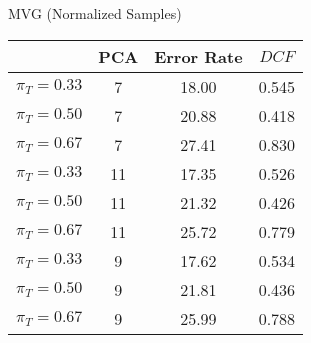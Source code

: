 \caption{MVG (Normalized Samples)}\label{tab:mvgn_acctable}
\begin{center}
\begin{tabular}{|c|c||c|c|}
\hline
\ & PCA & Error Rate & $DCF$\\
\hline
$\pi_T = 0.33$ & 7 & 18.00 & 0.545 \\
$\pi_T = 0.50$ & 7 & 20.88 & 0.418 \\
$\pi_T = 0.67$ & 7 & 27.41 & 0.830 \\
\hline
$\pi_T = 0.33$ & 11 & 17.35 & 0.526 \\
$\pi_T = 0.50$ & 11 & 21.32 & 0.426 \\
$\pi_T = 0.67$ & 11 & 25.72 & 0.779 \\
\hline
$\pi_T = 0.33$ & 9 & 17.62 & 0.534 \\
$\pi_T = 0.50$ & 9 & 21.81 & 0.436 \\
$\pi_T = 0.67$ & 9 & 25.99 & 0.788 \\
\hline
\end{tabular}
\end{center}
